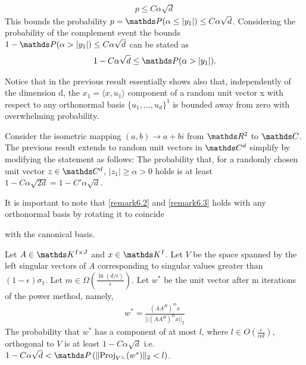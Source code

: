 \documentclass[a4paper, english, headtopline=0.08em, headsepline=0.04em, left = 1cm, right = 1cm, DIV=15]{article}
\begin{document}
\begin{align*}
	p \leq  C\alpha \sqrt{d}
\end{align*}
This bounds the probability $p = \PP (\alpha \leq|y_1|) \leq  C\alpha \sqrt{d}$. Considering the probability of the complement event
the bounds $1-\PP (\alpha > |y_1|) \leq  C\alpha \sqrt{d}$ can be stated as 
\begin{align*}
	1-C\alpha \sqrt{d} \leq \PP (\alpha > |y_1|).
\end{align*}
\begin{remark} \label{remark6.2}
Notice that in the previous result essentially shows also that, independently of the dimension d, the $x_1 = \langle x,u_1\rangle$  component
of a random unit vector x with respect to any orthonormal basis $\{u_1 , . . . , u_d \}^1$ is bounded away from zero with overwhelming
probability.
\end{remark}
\begin{remark} \label{remark6.3}
Consider the isometric mapping $(a,b) \rightarrow a+bi$ from $\RR^2$ to $\CC$. The previous
result extends to random unit vectors in $\CC^d$ simplify by modifying the statement as follows:
The probability that, for a randomly chosen unit vector $z\in\CC^d$, $|z_1|\geq\alpha >0$ holds is
at least $1-C\alpha\sqrt{2d}=1-C'\alpha\sqrt{d}$.
\end{remark}
It is important to note that \cref{remark6.2} and \cref{remark6.3} holds with any orthonormal basis by rotating it to coincide


with the canonical basis.
\begin{theorem}
Let $A\in \KK^{I \times  J}$ and $x\in \KK^I$. Let $V$ be the space spanned by
the left singular vectors of $A$ corresponding to singular values greater than $(1-\epsilon)\sigma_1$.
Let $m\in \Omega\left(\frac{\ln(d/\epsilon)}{\epsilon}\right)$. Let $w^*$ be the unit vector after m iterations
of the power method, namely,
\begin{align} \label{t6.4_theorem}
	w^* = \frac{\left(AA^H\right)^mx}{||\left(AA^H\right)^mx||_2}
\end{align}
The probability that $w^*$ has a component of at most $l$, where  $l \in O\left(\frac{\epsilon}{\alpha d}\right)$,
orthogonal to $V$ is at least $1-C\alpha\sqrt{d}$ i.e. $1-C\alpha\sqrt{d} < \PP \left(\|\text{Proj}_{V^{\bot }}(w^*)\|_2<l\right)$.
\end{theorem}
\end{document}
